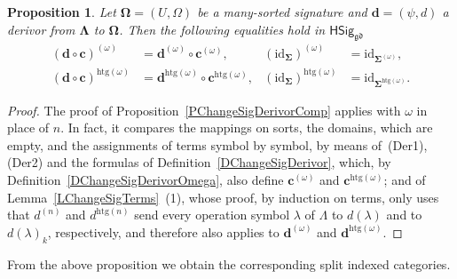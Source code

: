 \documentclass[a4paper, reqno]{amsbook}
\newcommand{\sig}[1]{\mathbf{#1}}             %
\newcommand{\gd}{\mathfrak{gd}}              %
\newcommand{\htg}{\mathrm{htg}}                %
\newcommand{\id}{\mathrm{id}}
\theoremstyle{plain}
\newtheorem{proposition}[theorem]{Proposition}
\theoremstyle{definition}
\begin{document}
\begin{proposition}\label{PChangeSigDerivorCompOmega}
Let $\sig{\Omega}=(U,\Omega)$ be a many-sorted signature and $\mathbf{d}=(\psi,d)$ a derivor from $\sig{\Lambda}$ to $\sig{\Omega}$.
Then the following equalities hold in $\mathsf{HSig}_{\gd}$
\begin{align*}
(\mathbf{d}\circ\mathbf{c})^{(\omega)}&=\mathbf{d}^{(\omega)}\circ\mathbf{c}^{(\omega)},
&
(\id_{\sig{\Sigma}})^{(\omega)}&=\id_{\sig{\Sigma}^{(\omega)}},
\\
(\mathbf{d}\circ\mathbf{c})^{\htg(\omega)}&=\mathbf{d}^{\htg(\omega)}\circ\mathbf{c}^{\htg(\omega)},
&
(\id_{\sig{\Sigma}})^{\htg(\omega)}&=\id_{\sig{\Sigma}^{\htg(\omega)}}.
\end{align*}
\end{proposition}
\begin{proof}
The proof of Proposition~\ref{PChangeSigDerivorComp} applies with $\omega$ in place of $n$.
In fact, it compares the mappings on sorts, the domains, which are empty, and the assignments of terms symbol by symbol, by means of~(Der1), (Der2) and the formulas of Definition~\ref{DChangeSigDerivor}, which, by Definition~\ref{DChangeSigDerivorOmega}, also define $\mathbf{c}^{(\omega)}$ and $\mathbf{c}^{\htg(\omega)}$; and of Lemma~\ref{LChangeSigTerms}~(1), whose proof, by induction on terms, only uses that $d^{(n)}$ and $d^{\htg(n)}$ send every operation symbol $\lambda$ of $\Lambda$ to $d(\lambda)$ and to $d(\lambda)_{k}$, respectively, and therefore also applies to $\mathbf{d}^{(\omega)}$ and $\mathbf{d}^{\htg(\omega)}$.
\end{proof}

From the above proposition we obtain the corresponding split indexed categories.
\end{document}
